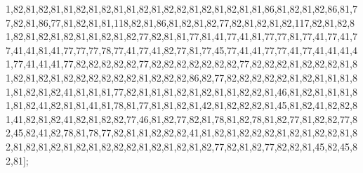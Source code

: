 1,82,81,82,81,81,82,81,82,81,81,82,81,82,82,81,82,81,82,81,81,86,81,82,81,82,86,81,77,82,81,86,77,81,82,81,81,118,82,81,86,81,82,81,82,77,82,81,82,81,82,117,82,81,82,81,82,81,82,81,82,81,81,82,81,82,77,82,81,81,77,81,41,77,41,81,77,77,81,77,41,77,41,77,41,41,81,41,77,77,77,78,77,41,77,41,82,77,81,77,45,77,41,41,77,77,41,77,41,41,41,41,77,41,41,41,77,82,82,82,82,82,77,82,82,82,82,82,82,82,77,82,82,82,81,82,82,82,81,81,82,81,82,81,82,82,82,82,82,82,81,82,82,82,86,82,77,82,82,82,82,82,81,82,81,81,81,81,81,82,81,82,41,81,81,81,77,82,81,81,81,82,81,82,81,81,82,82,81,46,81,82,81,81,81,81,81,82,41,82,81,81,41,81,78,81,77,81,81,82,81,42,81,82,82,82,81,45,81,82,41,82,82,81,41,82,81,82,41,82,81,82,82,77,46,81,82,77,82,81,78,81,82,78,81,82,77,81,82,82,77,82,45,82,41,82,78,81,78,77,82,81,81,82,82,82,41,81,82,81,82,82,82,81,82,81,82,82,81,82,81,82,81,82,81,82,81,82,82,82,81,82,81,82,81,82,77,82,81,82,77,82,82,81,45,82,45,82,81];

